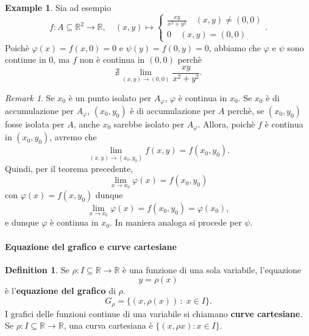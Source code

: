 \documentclass{article}
\theoremstyle{plain}
\theoremstyle{definition}
\newtheorem{defn}{Definition}[section]
\newtheorem{exmp}{Example}[section]
\theoremstyle{remark}
\newtheorem{rem}{Remark}
\begin{document}
\vspace{10pt}

\begin{exmp}
Sia ad esempio 
\[f:A\subseteq\mathbb{R}^2\to\mathbb{R},\quad (x,y)\mapsto\begin{cases}
    \frac{xy}{x^2+y^2}\quad (x,y)\neq(0,0)\\
    0\quad (x,y)=(0,0)
\end{cases}.\]
Poichè \(\varphi(x)=f(x,0)=0\) e  \(\psi(y)=f(0,y)=0\), abbiamo che 
$\varphi$ e $\psi$ sono continue in $0$, ma $f$ non è continua in $(0,0)$ perchè 
\[\nexists\lim_{(x,y)\to(0,0)}\dfrac{xy}{x^2+y^2}.\]
\end{exmp}

\vspace{10pt}

\begin{rem}
    Se $x_0$ è un punto isolato per $A_\varphi$, $\varphi$ è continua in $x_0$. 
    Se $x_0$ è di accumulazione per $A_\varphi$, $(x_0,y_0)$ è di accumulazione per $A$ perchè, se $(x_0,y_0)$ fosse isolata per $A$, anche $x_0$ sarebbe isolato per $A_\varphi$.
    Allora, poichè $f$ è continua in $(x_0,y_0)$, avremo che \[\lim_{(x,y)\to(x_0,y_0)}f(x,y)=f(x_0,y_0).\]
    Quindi, per il teorema precedente, 
    \[\lim_{x\to x_0}\varphi(x)=f(x_0,y_0)\] con $\varphi(x)=f(x,y_0)$ dunque 
    \[\lim_{x\to x_0}\varphi(x)=f(x_0,y_0)=\varphi(x_0), \]
    e dunque $\varphi$ è continua in $x_0$.
    In maniera analoga si procede per $\psi$.
\end{rem}

\vspace{10pt}

\paragraph{Equazione del grafico e curve cartesiane}
\begin{bxthm}
\begin{defn}
    Se $\rho :I\subseteq\mathbb{R}\to\mathbb{R} $ è una funzione di una sola variabile, l'equazione 
    \[y=\rho(x)\]
    è l'\textbf{equazione del grafico} di $\rho$.
    \[G_\rho=\{(x,\rho(x))\,:\;x\in I\}.\]
    I grafici delle funzioni continue di una variabile si chiamano \textbf{curve cartesiane}. 
    Se $\rho :I\subseteq\mathbb{R}\to\mathbb{R}$, una curva cartesiana è $\{(x,\rho x):x\in I\}$.    
\end{defn}
\end{bxthm}

\vspace{10pt}
\end{document}
